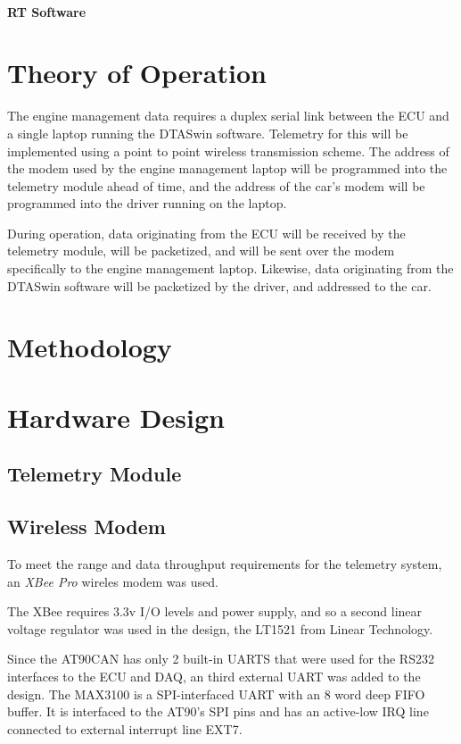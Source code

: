 \paragraph*{RT Software}

\section{Theory of Operation}

The engine management data requires a duplex serial link between the ECU and a single laptop running the DTASwin software. Telemetry for this will be implemented using a point to point wireless transmission scheme. The address of the modem used by the engine management laptop will be programmed into the telemetry module ahead of time, and the address of the car's modem will be programmed into the driver running on the laptop.

During operation, data originating from the ECU will be received by the telemetry module, will be packetized, and will be sent over the modem specifically to the engine management laptop. Likewise, data originating from the DTASwin software will be packetized by the driver, and addressed to the car.

\section{Methodology}
\label{sec:methodology}

\section{Hardware Design}

\subsection{Telemetry Module}

\subsection{Wireless Modem}

To meet the range and data throughput requirements for the telemetry system, an \emph{XBee Pro} wireles modem was used.

The XBee requires 3.3v I/O levels and power supply, and so a second linear voltage regulator was used in the design, the LT1521 from Linear Technology.

Since the AT90CAN has only 2 built-in UARTS that were used for the RS232 interfaces to the ECU and DAQ, an third external UART was added to the design. The MAX3100 is a SPI-interfaced UART with an 8 word deep FIFO buffer. It is interfaced to the AT90's SPI pins and has an active-low IRQ line connected to external interrupt line EXT7.

